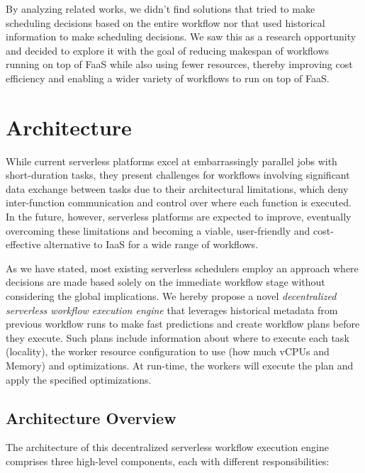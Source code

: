 \documentclass[conference]{IEEEtran}
\begin{document}
By analyzing related works, we didn't find solutions that tried to make scheduling decisions based on the entire workflow nor that used historical information to make scheduling decisions. We saw this as a research opportunity and decided to explore it with the goal of reducing makespan of workflows running on top of FaaS while also using fewer resources, thereby improving cost efficiency and enabling a wider variety of workflows to run on top of FaaS.

\section{Architecture}
\label{s:architecture}

While current serverless platforms excel at embarrassingly parallel jobs with short-duration tasks, they present challenges for workflows involving significant data exchange between tasks due to their architectural limitations, which deny inter-function communication and control over where each function is executed. In the future, however, serverless platforms are expected to improve, eventually overcoming these limitations and becoming a viable, user-friendly and cost-effective alternative to IaaS for a wide range of workflows.

As we have stated, most existing serverless schedulers employ an approach where decisions are made based solely on the immediate workflow stage without considering the global implications. We hereby propose a novel \textit{decentralized serverless workflow execution engine} that leverages historical metadata from previous workflow runs to make fast predictions and create workflow plans before they execute. Such plans include information about where to execute each task (locality), the worker resource configuration to use (how much vCPUs and Memory) and optimizations. At run-time, the workers will execute the plan and apply the specified optimizations.

\subsection{Architecture Overview}

The architecture of this decentralized serverless workflow execution engine comprises three high-level components, each with different responsibilities:
\end{document}
